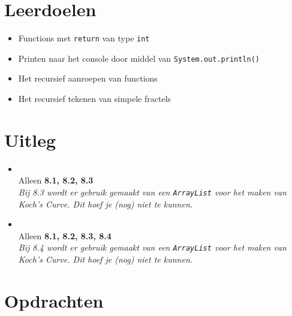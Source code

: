 \newcommand{\tttt}{Recursie}
\newcommand{\dddd}{Datum 1}



\section{Leerdoelen}
\begin{itemize}
    \item Functions met \texttt{return} van type \texttt{int}
    \item Printen naar het console door middel van \texttt{System.out.println()}
    \item Het recursief aanroepen van functions
    \item Het recursief tekenen van simpele fractels
\end{itemize}

\section{Uitleg}
\begin{itemize}
    \item {}\\
    Alleen \textbf{8.1, 8.2, 8.3}\\
    \textit{Bij 8.3 wordt er gebruik gemaakt van een \texttt{ArrayList} voor het maken van Koch's Curve. Dit hoef je (nog) niet te kunnen.}
    \item {}\\
    Alleen \textbf{8.1, 8.2, 8.3, 8.4}\\
    \textit{Bij 8.4 wordt er gebruik gemaakt van een \texttt{ArrayList} voor het maken van Koch's Curve. Dit hoef je (nog) niet te kunnen.}
\end{itemize}

\section{Opdrachten}
